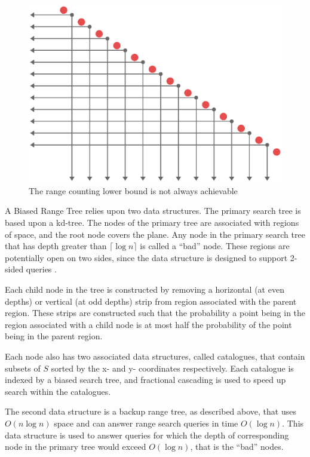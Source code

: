 \documentclass[mcs]{scsthesis}
\begin{document}
\begin{figure}
\begin{center}
\includegraphics[scale=0.6]{diagrams/range_counting.eps}
\caption{The range counting lower bound is not always achievable}
\label{fig:rangelb}
\end{center}
\end{figure}

A Biased Range Tree relies upon two data structures. The primary search tree
is based upon a kd-tree. The nodes of the primary tree are associated with
regions of space, and the root node covers the plane. Any node in the primary
search tree that has depth greater than \(\lceil \log n\rceil\) is called a
``bad'' node.  These regions are potentially open on two sides, since the data
structure is designed to support 2-sided queries \cite{biasedrange}. 

Each child node in the tree is constructed by removing a horizontal (at even
depths) or vertical (at odd depths) strip from region associated with the
parent region. These strips are constructed such that the probability a point
being in the region associated with a child node is at most half the probability
of the point being in the parent region.

Each node also has two associated data structures, called catalogues, that 
contain subsets of \(S\) sorted by the x- and y- coordinates respectively.
Each catalogue is indexed by a biased search tree, and fractional cascading is
used to speed up search within the catalogues.

The second data structure is a backup range tree, as described above, that 
uses \(O(n \log n)\) space and can answer range search queries in time
\(O(\log n)\). This data structure is used to answer queries for which the
depth of corresponding node in the primary tree would exceed \(O(\log n)\),
that is the ``bad'' nodes.
\end{document}
